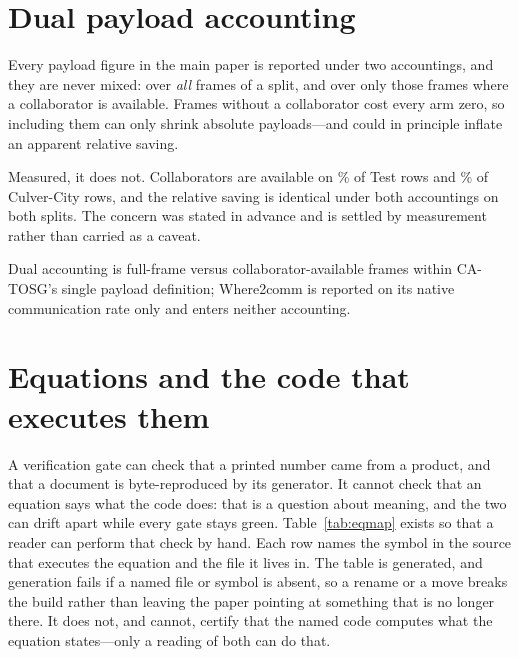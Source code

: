 \documentclass[journal]{IEEEtran}
\newcommand{\method}{CA-TOSG}
\begin{document}
\section{Dual payload accounting}
Every payload figure in the main paper is reported under two accountings, and they are never mixed:
over \emph{all} frames of a split, and over only those frames where a collaborator is available.
Frames without a collaborator cost every arm zero, so including them can only shrink absolute
payloads---and could in principle inflate an apparent relative saving.

Measured, it does not. Collaborators are available on \TestCollabShare\% of Test rows and
\CulverCollabShare\% of Culver-City rows, and the relative saving is identical under both
accountings on both splits. The concern was stated in advance and is settled by measurement rather
than carried as a caveat.

Dual accounting is full-frame versus collaborator-available frames within \method{}'s single
payload definition; Where2comm is reported on its native communication rate only and enters neither
accounting.

\section{Equations and the code that executes them}
A verification gate can check that a printed number came from a product, and that a document is
byte-reproduced by its generator. It cannot check that an equation says what the code does: that is
a question about meaning, and the two can drift apart while every gate stays green. Table~\ref{tab:eqmap}
exists so that a reader can perform that check by hand. Each row names the symbol in the source that
executes the equation and the file it lives in. The table is generated, and generation fails if a
named file or symbol is absent, so a rename or a move breaks the build rather than leaving the paper
pointing at something that is no longer there. It does not, and cannot, certify that the named code
computes what the equation states---only a reading of both can do that.

\begin{table}[t]
\caption{Every numbered equation of the main paper and the code that executes it. Paths are
relative to the repository root; those without a leading directory of their own sit under
\texttt{projects/ca\_tosg/}, except \texttt{opencood/}, which is the detector codebase.}
\label{tab:eqmap}
\centering\footnotesize\setlength{\tabcolsep}{5pt}

\end{table}
\end{document}
